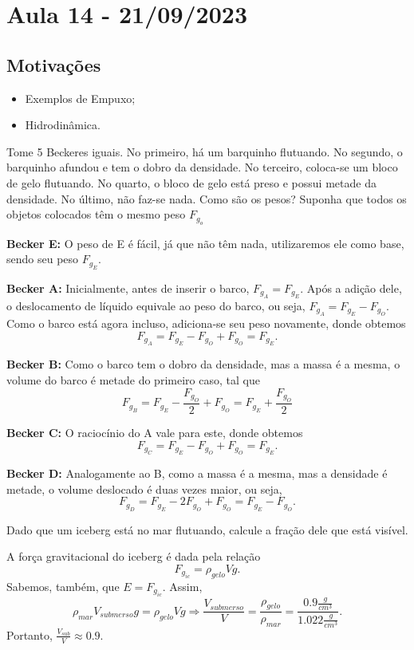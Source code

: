 \documentclass[PhysicsII/physicsII_notes.tex]{subfiles}
\begin{document}
\section{Aula 14 - 21/09/2023}
\subsection{Motivações}
\begin{itemize}
	\item Exemplos de Empuxo;
	\item Hidrodinâmica.
\end{itemize}
\begin{example}
	Tome 5 Beckeres iguais. No primeiro, há um barquinho flutuando. No segundo, o barquinho afundou e tem o dobro da densidade. No terceiro,
	coloca-se um bloco de gelo flutuando. No quarto, o bloco de gelo está preso e possui metade da densidade. No último, não faz-se nada. Como são os pesos?
	Suponha que todos os objetos colocados têm o mesmo peso \(F_{g_{o}}\)

	\textbf{Becker E:}
	O peso de E é fácil, já que não têm nada, utilizaremos ele como base, sendo seu peso \(F_{g_{E}}\).

	\textbf{Becker A:}
	Inicialmente, antes de inserir o barco, \(F_{g_{A}} = F_{g_{E}}\). Após a adição dele, o deslocamento de líquido equivale ao peso do barco,
	ou seja, \(F_{g_{A}} = F_{g_{E}}-F_{g_{O}}.\) Como o barco está agora incluso, adiciona-se seu peso novamente, donde obtemos
	\[
		F_{g_{A}} = F_{g_{E}} - F_{g_{O}} + F_{g_{O}} = F_{g_{E}}.
	\]

	\textbf{Becker B:}
	Como o barco tem o dobro da densidade, mas a massa é a mesma, o volume do barco é metade do primeiro caso, tal que
	\[
		F_{g_{B}} = F_{g_{E}} - \frac{F_{g_{O}}}{2} + F_{g_{O}} = F_{g_{E}} + \frac{F_{g_{O}}}{2}
	\]

	\textbf{Becker C:}
	O raciocínio do A vale para este, donde obtemos
	\[
		F_{g_{C}} = F_{g_{E}} - F_{g_{O}} + F_{g_{O}} = F_{g_{E}}.
	\]

	\textbf{Becker D:}
	Analogamente ao B, como a massa é a mesma, mas a densidade é metade, o volume deslocado é duas vezes maior, ou seja,
	\[
		F_{g_{D}} = F_{g_{E}} - 2 F_{g_{O}} + F_{g_{O}} = F_{g_{E}} - F_{g_{O}}.
	\]
\end{example}
\begin{example}
	Dado que um iceberg está no mar flutuando, calcule a fração dele que está visível.

	A força gravitacional do iceberg é dada pela relação
	\[
		F_{g_{ic}} = \rho_{gelo}Vg.
	\]
	Sabemos, também, que \(E = F_{g_{ic}}\). Assim,
	\[
		\rho_{mar}V_{submerso}g = \rho_{gelo}Vg \Rightarrow \frac{V_{submerso}}{V} = \frac{\rho_{gelo}}{\rho_{mar}} = \frac{0.9\frac{g}{cm^{3}}}{1.022\frac{g}{cm^{3}}}.
	\]
	Portanto, \(\frac{V_{sub}}{V}\approx 0.9\).
\end{example}
\end{document}
